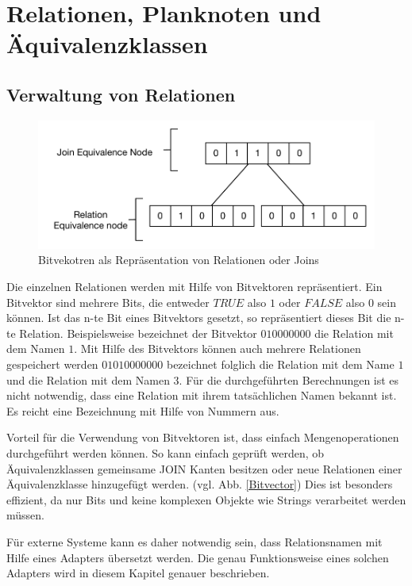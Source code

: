 \section{Relationen, Planknoten und Äquivalenzklassen}

\subsection{Verwaltung von Relationen}
\label{sec:Bitvector}


\begin{figure}[ht]
  \centering
  \includegraphics{04_Implementierung/Bitvector.pdf}
  \caption{Bitvekotren als Repräsentation von Relationen oder Joins}
  \label{Bitvektor}
\end{figure}

Die einzelnen Relationen werden mit Hilfe von Bitvektoren repräsentiert. Ein Bitvektor sind mehrere Bits, die entweder $TRUE$ also $1$ oder $FALSE$ also $0$ sein können. Ist das n-te Bit eines Bitvektors gesetzt, so repräsentiert dieses Bit die n-te Relation. Beispielsweise bezeichnet der Bitvektor $010000000$ die Relation mit dem Namen $1$. Mit Hilfe des Bitvektors können auch mehrere Relationen gespeichert werden $01010000000$ bezeichnet folglich die Relation mit dem Name $1$ und die Relation mit dem Namen $3$. Für die durchgeführten Berechnungen ist es nicht notwendig, dass eine Relation mit ihrem tatsächlichen Namen bekannt ist. Es reicht eine Bezeichnung mit Hilfe von Nummern aus.

Vorteil für die Verwendung von Bitvektoren ist, dass einfach Mengenoperationen durchgeführt werden können. So kann einfach geprüft werden, ob Äquivalenzklassen gemeinsame JOIN Kanten besitzen oder neue Relationen einer Äquivalenzklasse hinzugefügt werden. (vgl. Abb. \ref{Bitvector}) Dies ist besonders effizient, da nur Bits und keine komplexen Objekte wie Strings verarbeitet werden müssen.


Für externe Systeme kann es daher notwendig sein, dass Relationsnamen mit Hilfe eines Adapters übersetzt werden. Die genau Funktionsweise eines solchen Adapters wird in diesem Kapitel genauer beschrieben.




